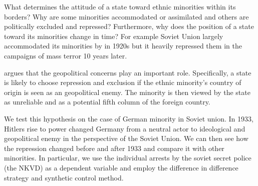 What determines the attitude of a state toward ethnic minorities within
its borders? Why are some minorities accommodated or assimilated and
others are politically excluded and repressed? Furthermore,  why does the
position of a state toward its minorities change in time? For example
Soviet Union largely accommodated its minorities by in 1920s but it
heavily repressed them in the campaigns of  mass terror 10 years later. 

\citet{mylonas_politics_2013} argues that the geopolitical concerns play an important role. Specifically, a state is likely to choose repression and
exclusion if the ethnic minority's country of origin is seen as an
geopolitical enemy. The minority is then viewed by the state as
unreliable and as a potential fifth column of the foreign country.   

We test this hypothesis on the case of German minority in Soviet union.
In 1933, Hitlers rise to power changed Germany from a neutral actor to ideological and geopolitical enemy in the perspective of the Soviet Union. We can then see how the repression changed before and after 1933 and compare it with other minorities. In particular, we use the individual arrests by the soviet secret police (the NKVD) as a dependent variable and employ the difference in difference strategy and synthetic control method. 





